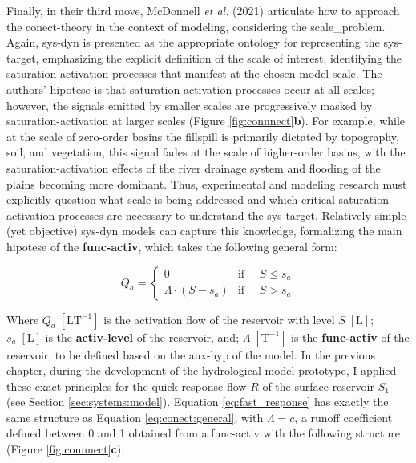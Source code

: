 \documentclass[./main_en.tex]{subfiles}
\begin{document}
\par Finally, in their third move, McDonnell \textit{et al.} (2021) articulate how to approach the \gls{conect-theory} in the context of modeling, considering the \gls{scale_problem}. Again, \gls{sys-dyn} is presented as the appropriate ontology for representing the \gls{sys-target}, emphasizing the explicit definition of the scale of interest, identifying the saturation-activation processes that manifest at the chosen \gls{model-scale}. The authors' \gls{hipotese} is that saturation-activation processes occur at all scales; however, the signals emitted by smaller scales are progressively masked by saturation-activation at larger scales (Figure \ref{fig:connnect}\textbf{b}). For example, while at the scale of zero-order basins the \gls{fillspill} is primarily dictated by topography, soil, and vegetation, this signal fades at the scale of higher-order basins, with the saturation-activation effects of the river drainage \gls{system} and flooding of the plains becoming more dominant. Thus, experimental and modeling research must explicitly question what scale is being addressed and which critical saturation-activation processes are necessary to understand the \gls{sys-target}. Relatively simple (yet objective) \gls{sys-dyn} models can capture this knowledge, formalizing the main \gls{hipotese} of the \textbf{\gls{func-activ}}, which takes the following general form:
\begin{linenomath*}
\begin{equation}
\label{eq:conect:general}
Q_a = 
\begin{cases} 
    0 & \text{if } \quad S \leq s_a\\
    \Lambda \cdot (S - s_a) & \text{if } \quad S > s_a
\end{cases}
\end{equation}
\end{linenomath*}
Where $Q_a\;[\text{L}\text{T}^{-1}]$ is the activation flow of the reservoir with level $S\;[\text{L}]$; $s_{a}\;[\text{L}]$ is the \textbf{\gls{activ-level}} of the reservoir, and; $\Lambda \;[\text{T}^{-1}]$ is the \textbf{\gls{func-activ}} of the reservoir, to be defined based on the \gls{aux-hyp} of the \gls{model}. In the previous chapter, during the development of the hydrological \gls{model} prototype, I applied these exact principles for the quick response flow $R$ of the surface reservoir $S_1$ (see Section \ref{sec:systems:model}). Equation \eqref{eq:fast_response} has exactly the same structure as Equation \eqref{eq:conect:general}, with $\Lambda = c$, a runoff coefficient defined between 0 and 1 obtained from a \gls{func-activ} with the following structure (Figure \ref{fig:connnect}\textbf{c}):
\end{document}
